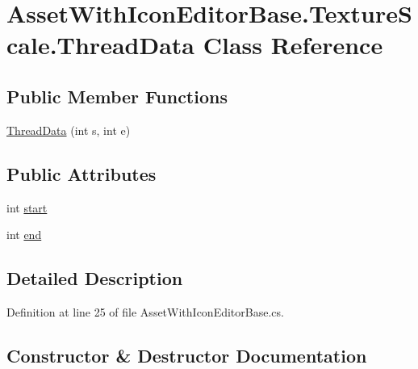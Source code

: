 \hypertarget{class_asset_with_icon_editor_base_1_1_texture_scale_1_1_thread_data}{}\section{Asset\+With\+Icon\+Editor\+Base.\+Texture\+Scale.\+Thread\+Data Class Reference}
\label{class_asset_with_icon_editor_base_1_1_texture_scale_1_1_thread_data}
\subsection*{Public Member Functions}
\begin{DoxyCompactItemize}
\item 
\mbox{\hyperlink{class_asset_with_icon_editor_base_1_1_texture_scale_1_1_thread_data_a3478ce6233960fdd63242b5204cb1f5b}{Thread\+Data}} (int s, int e)
\end{DoxyCompactItemize}
\subsection*{Public Attributes}
\begin{DoxyCompactItemize}
\item 
int \mbox{\hyperlink{class_asset_with_icon_editor_base_1_1_texture_scale_1_1_thread_data_af8b2f9364d68b9855826c9d2badbc502}{start}}
\item 
int \mbox{\hyperlink{class_asset_with_icon_editor_base_1_1_texture_scale_1_1_thread_data_ab5f4341258877819d663fa088f40b603}{end}}
\end{DoxyCompactItemize}


\subsection{Detailed Description}


Definition at line 25 of file Asset\+With\+Icon\+Editor\+Base.\+cs.



\subsection{Constructor \& Destructor Documentation}
\mbox{\label{class_asset_with_icon_editor_base_1_1_texture_scale_1_1_thread_data_a3478ce6233960fdd63242b5204cb1f5b}} 
